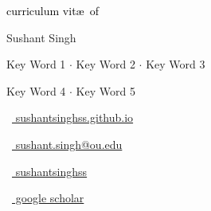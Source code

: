 \begin{scriptsize}
	 \textcolor{black}{curriculum vit\ae~of}
\end{scriptsize}

\vspace*{-0.10em}
\begin{Large} 
	Sushant Singh
\end{Large}

\vspace*{0.25em}
\begin{scshape}
	\begin{footnotesize}
		  \textcolor{highlight2}{Key Word 1 $\cdot$ Key Word 2 $\cdot$ Key Word 3}
		  
		  \vspace*{-1ex}
		  \textcolor{highlight2}{Key Word 4 $\cdot$ Key Word 5}
	\end{footnotesize}
\end{scshape}
\vspace*{0.4cm}

\begin{footnotesize}
	\begin{tiny}\faHome\end{tiny}~\href{https://google.com}{
		sushantsinghss.github.io
	}
	\quad \begin{tiny}\faEnvelope[regular]\end{tiny}~\href{mailto:sushant.singh@ou.edu}{%
		sushant.singh@ou.edu
	} 
	\quad 
	\begin{tiny}\faLinkedinIn\end{tiny}~\href{https://www.linkedin.com/in/sushantsinghss/}{
		sushantsinghss
	}
	\quad 
	\begin{tiny}\faGraduationCap\end{tiny}~\href{https://scholar.google.com/citations?user=USERID&hl=en}{
		 google scholar
		}

\end{footnotesize}